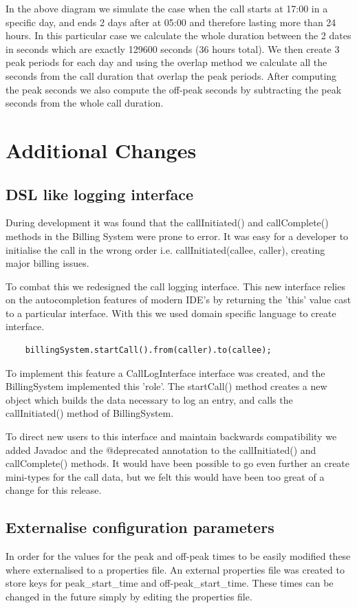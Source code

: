 \documentclass[pdftex,11pt,a4paper]{article}
\begin{document}
In the above diagram we simulate the case when the call starts at 17:00 in a specific day, and ends 2 days after at 05:00 and therefore lasting more than 24 hours. In this particular case we calculate the whole duration between the 2 dates in seconds which are exactly 129600 seconds (36 hours total). We then create 3 peak periods for each day and using the overlap method we calculate all the seconds from the call duration that overlap the peak periods. After computing the peak seconds we also compute the off-peak seconds by subtracting the peak seconds from the whole call duration.
\section{Additional Changes}

\subsection{DSL like logging interface}
During development it was found that the callInitiated() and callComplete() methods in the Billing System were prone to error. It was easy for a developer to initialise the call in the wrong order i.e. callInitiated(callee, caller), creating major billing issues.

To combat this we redesigned the call logging interface. This new interface relies on the autocompletion features of modern IDE's by returning the 'this' value cast to a particular interface. With this we used domain specific language to create interface.
\begin{lstlisting}
	billingSystem.startCall().from(caller).to(callee);
\end{lstlisting}
To implement this feature a CallLogInterface interface was created, and the BillingSystem implemented this 'role'. The startCall() method creates a new object which builds the data necessary to log an entry, and calls the callInitiated() method of BillingSystem.

To direct new users to this interface and maintain backwards compatibility we added Javadoc and the @deprecated annotation to the callInitiated()  and callComplete() methods. It would have been possible to go even further an create mini-types for the call data, but we felt this would have been too great of a change for this release.

\subsection{Externalise configuration parameters}
In order for the values for the peak and off-peak times to be easily modified these where externalised to a properties file. An external properties file was created to store keys for peak\_start\_time and off-peak\_start\_time. These times can be changed in the future simply by editing the properties file.
\end{document}
